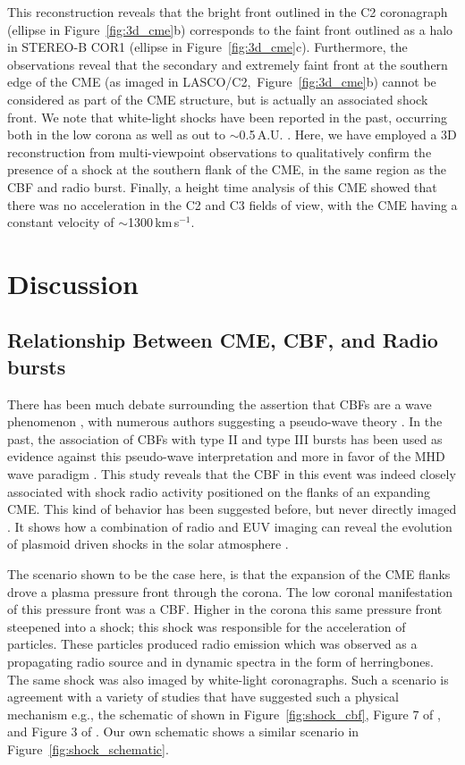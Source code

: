 This reconstruction reveals that the bright front outlined in the C2 coronagraph (ellipse in Figure~\ref{fig:3d_cme}b) corresponds to the faint front outlined as a halo in STEREO-B COR1 (ellipse in Figure~\ref{fig:3d_cme}c). Furthermore, the observations reveal that the secondary and extremely faint front at the southern edge of the CME (as imaged in LASCO/C2,~Figure~\ref{fig:3d_cme}b) cannot be considered as part of the CME structure, but is actually an associated shock front. We note that white-light shocks have been reported in the past, occurring both in the low corona as well as out to $\sim$0.5\,A.U. \citep{vourlidas2012, maloney2011}. Here, we have employed a 3D reconstruction from multi-viewpoint observations to qualitatively confirm the presence of a shock at the southern flank of the CME, in the same region as the CBF and radio burst. Finally, a height time analysis of this CME showed that there was no acceleration in the C2 and C3 fields of view, with the CME having a constant velocity of $\sim$1300\,km\,s$^{-1}$.


\section{Discussion}

\subsection{Relationship Between CME, CBF, and Radio bursts}\label{sec:31}

There has been much debate surrounding the assertion that CBFs are a wave phenomenon \citep{gallagher2011}, with numerous authors suggesting a pseudo-wave theory \citep{delannee2008}. In the past, the association of CBFs with type II and type III bursts has been used as evidence against this pseudo-wave interpretation and more in favor of the MHD wave paradigm \citep{warmuth2004b, grechnev2011}. This study reveals that the CBF in this event was indeed closely associated with shock radio activity positioned on the flanks of an expanding CME. This kind of behavior has been suggested before, but never directly imaged \citep{kozarev2011, feng2012, feng2013}. It shows how a combination of radio and EUV imaging can reveal the evolution of plasmoid driven shocks in the solar atmosphere \citep{bain2012}.

The scenario shown to be the case here, is that the expansion of the CME flanks drove a plasma pressure front through the corona. The low coronal manifestation of this pressure front was a CBF. Higher in the corona this same pressure front steepened into a shock; this shock was responsible for the acceleration of particles. These particles produced radio emission which was observed as a propagating radio source and in dynamic spectra in the form of herringbones. The same shock was also imaged by white-light coronagraphs. Such a scenario is agreement with a variety of studies that have suggested such a physical mechanism e.g., the schematic of \citet{grechnev2011a} shown in Figure~\ref{fig:shock_cbf}, Figure 7 of \citet{warmuth2004b}, and Figure 3 of \citep{stewart1980}. Our own schematic shows a similar scenario in Figure~\ref{fig:shock_schematic}.

